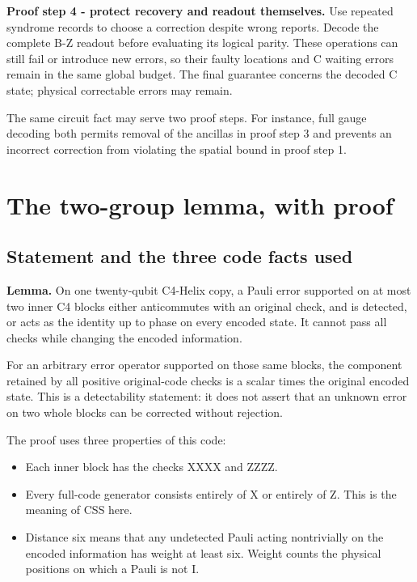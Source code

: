 \documentclass[11pt]{article}
\begin{document}
\textbf{Proof step 4 - protect recovery and readout themselves.} Use repeated syndrome records to choose a correction despite wrong reports. Decode the complete B-Z readout before evaluating its logical parity. These operations can still fail or introduce new errors, so their faulty locations and C waiting errors remain in the same global budget. The final guarantee concerns the decoded C state; physical correctable errors may remain.

The same circuit fact may serve two proof steps. For instance, full gauge decoding both permits removal of the ancillas in proof step 3 and prevents an incorrect correction from violating the spatial bound in proof step 1.

\section{The two-group lemma, with proof}
\subsection{Statement and the three code facts used}
\textbf{Lemma.} On one twenty-qubit C4-Helix copy, a Pauli error supported on at most two inner C4 blocks either anticommutes with an original check, and is detected, or acts as the identity up to phase on every encoded state. It cannot pass all checks while changing the encoded information.

For an arbitrary error operator supported on those same blocks, the component retained by all positive original-code checks is a scalar times the original encoded state. This is a detectability statement: it does not assert that an unknown error on two whole blocks can be corrected without rejection.

The proof uses three properties of this code:

\begin{itemize}\setlength\itemsep{1pt}
\item Each inner block has the checks XXXX and ZZZZ.
\item Every full-code generator consists entirely of X or entirely of Z.
This is the meaning of CSS here.
\item Distance six means that any undetected Pauli acting nontrivially on
the encoded information has weight at least six. Weight counts the
physical positions on which a Pauli is not I.
\end{itemize}
\end{document}
